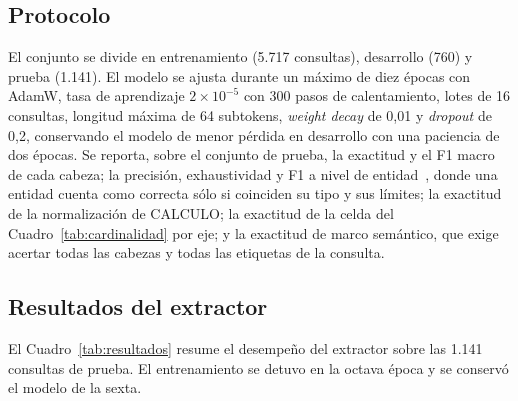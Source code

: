 \documentclass[11pt]{article}
\begin{document}
\subsection{Protocolo}

El conjunto se divide en entrenamiento (5.717 consultas), desarrollo (760) y
prueba (1.141). El modelo se ajusta durante un máximo de diez épocas con
AdamW, tasa de aprendizaje $2\times10^{-5}$ con 300 pasos de calentamiento,
lotes de 16 consultas, longitud máxima de 64 subtokens, \textit{weight decay} de
0,01 y \textit{dropout} de 0,2, conservando el modelo de menor pérdida en
desarrollo con una paciencia de dos épocas. Se reporta, sobre el conjunto de
prueba, la exactitud y el F1 macro de cada cabeza; la precisión, exhaustividad y
F1 a nivel de entidad~\citep{nakayama2018seqeval}, donde una entidad cuenta como
correcta sólo si coinciden su tipo y sus límites; la exactitud de la
normalización de CALCULO; la exactitud de la celda del Cuadro~\ref{tab:cardinalidad}
por eje; y la exactitud de marco semántico, que exige acertar todas las cabezas y
todas las etiquetas de la consulta.

\subsection{Resultados del extractor}

El Cuadro~\ref{tab:resultados} resume el desempeño del extractor sobre las
1.141 consultas de prueba. El entrenamiento se detuvo en la octava época y se
conservó el modelo de la sexta.
\end{document}
